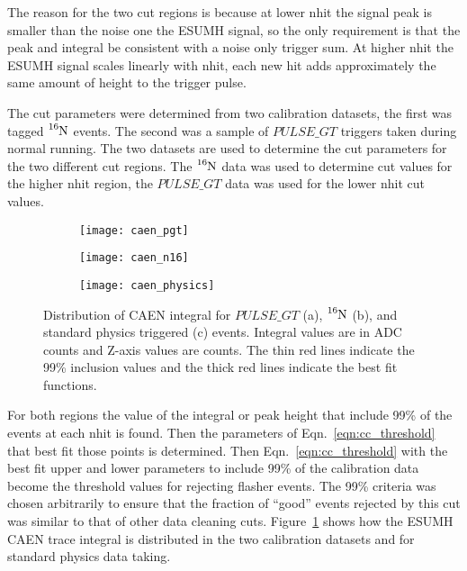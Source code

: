 The reason for the two cut regions is because at lower nhit the signal
peak is smaller than the noise one the ESUMH signal, so the only requirement
is that the peak and integral be consistent with a noise only trigger sum.
At higher nhit the ESUMH signal scales linearly with nhit, each new hit
adds approximately the same amount of height to the trigger pulse.

The cut parameters were determined from two calibration datasets, the first was
tagged $\ce{^{16}N}$
events. The second was a sample of $PULSE\_GT$ triggers taken during normal
running.
The two datasets are used to determine the cut parameters for the two
different cut regions.
The $\ce{^{16}N}$ data was used to determine cut values for the higher nhit
region, the $PULSE\_GT$ data was used for the lower nhit cut values.

\begin{figure}[htbp]
    \centering
    \begin{subfigure}[b]{0.48\textwidth}
        \centering
        \texttt{[image: caen\_pgt]}
        \caption[]{}
    \end{subfigure}
    \hfill
    \begin{subfigure}[b]{0.48\textwidth}
        \centering
        \texttt{[image: caen\_n16]}
        \caption[]{}
    \end{subfigure}

    \begin{subfigure}[b]{0.50\textwidth}
        \centering
        \texttt{[image: caen\_physics]}
        \caption[]{}
    \end{subfigure}
    \caption[]{Distribution of CAEN integral for $PULSE\_GT$ (a), $\ce{^{16}N}$ (b), and
    standard physics triggered (c) events. Integral values are in ADC counts
    and Z-axis values are counts. The thin red lines indicate the 99\% inclusion
    values and the thick red lines indicate the best fit functions.}
    \label{fig:caen_inclusion}
\end{figure}

For both regions the value of the integral or peak height that include
99\% of the events at each nhit is found. Then the parameters of
Eqn.~\ref{eqn:cc_threshold} that best fit those points is determined.
Then Eqn.~\ref{eqn:cc_threshold} with the best fit upper and lower
parameters to include 99\% of the calibration data become the threshold
values for rejecting flasher events.
The 99\% criteria was chosen arbitrarily to ensure that the fraction of
``good'' events rejected by this cut was similar to that of other data
cleaning cuts.
Figure~\ref{fig:caen_inclusion} shows how the ESUMH CAEN trace integral is distributed
in the two calibration datasets and for standard physics data taking.



